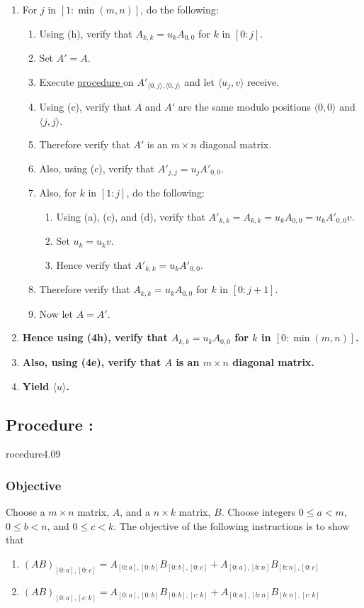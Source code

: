 \documentclass{article}
\newcounter{procedure}[part]
\newcommand{\procedure}[1]{\subsection*{Procedure \thepart:\theprocedure}\label{sec:procedure #1}\global\expandafter\edef\csname procedure#1\endcsname{\thepart:\theprocedure}\addtocounter{procedure}{1}}
\newcommand{\objective}{\subsubsection*{Objective}}
\newcommand{\procedurehr}[1]{\hyperref[sec:procedure #1]{procedure \expandafter\csname procedure#1\endcsname}}
\begin{document}
\begin{multicols}{2}
\begin{enumerate}
					\item For $j$ in $[1:\min(m,n)]$, do the following:
					\begin{enumerate}
						\item Using (h), verify that $A_{k,k}=u_kA_{0,0}$ for $k$ in $[0:j]$.
						\item Set $A'=A$.
						\item Execute \procedurehr{4.07} on $A'_{\langle 0,j\rangle,\langle 0,j\rangle}$ and let $\langle u_j,v\rangle$ receive.
						\item Using (c), verify that $A$ and $A'$ are the same modulo positions $\langle 0,0\rangle$ and $\langle j,j\rangle$.
						\item Therefore verify that $A'$ is an $m\times n$ diagonal matrix.
						\item Also, using (c), verify that $A'_{j,j}=u_jA'_{0,0}$.
						\item Also, for $k$ in $[1:j]$, do the following:
						\begin{enumerate}
							\item Using (a), (c), and (d), verify that $A'_{k,k}=A_{k,k}=u_kA_{0,0}=u_kA'_{0,0}v$.
							\item Set $u_k=u_kv$.
							\item Hence verify that $A'_{k,k}=u_kA'_{0,0}$.
						\end{enumerate}
						\item Therefore verify that $A_{k,k}=u_kA_{0,0}$ for $k$ in $[0:j+1]$.
						\item Now let $A=A'$.
					\end{enumerate}
					\item \textbf{Hence using (4h), verify that $A_{k,k}=u_kA_{0,0}$ for $k$ in $[0:\min(m,n)]$.}
					\item \textbf{Also, using (4e), verify that $A$ is an $m\times n$ diagonal matrix.}
					\item \textbf{Yield $\langle u\rangle$.}
				\end{enumerate}
		\procedure{4.09}
			\objective
				Choose a $m\times n$ matrix, $A$, and a $n\times k$ matrix, $B$. Choose integers $0\le a<m$, $0\le b<n$, and $0\le c<k$. The objective of the following instructions is to show that
				\begin{enumerate}
					\item $(AB)_{[0:a],[0:c]}=A_{[0:a],[0:b]}B_{[0:b],[0:c]}+A_{[0:a],[b:n]}B_{[b:n],[0:c]}$
					\item $(AB)_{[0:a],[c:k]}=A_{[0:a],[0:b]}B_{[0:b],[c:k]}+A_{[0:a],[b:n]}B_{[b:n],[c:k]}$

\end{enumerate}
\end{multicols}
\end{document}
